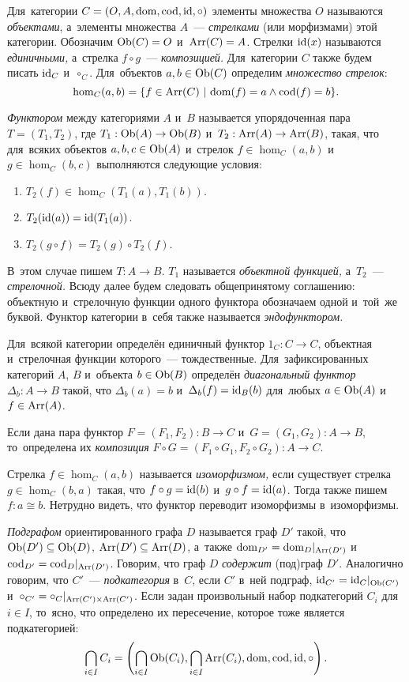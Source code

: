 \documentclass[a4paper,oneside]{article}
\begin{document}
Для~категории $C = (O, A, \mathrm{dom}, \mathrm{cod}, \mathrm{id}, \circ)$ элементы множества $O$ называются \textit{объектами},
а~элементы множества $A$~— \textit{стрелками} (или морфизмами) этой категории. Обозначим $\mathrm{Ob}(C) = O$ и~$\mathrm{Arr}(C) = A$.
Стрелки $\mathrm{id}(x)$ называются \textit{единичными,} а~стрелка $f \circ g$~— \textit{композицией.} Для~категории $C$ также будем писать $\mathrm{id}_C$ и~$\circ_C$.
Для~объектов $a, b \in \mathrm{Ob}(C)$ определим \textit{множество стрелок}:
\[
  \hom_C(a, b) = \{ f \in \mathrm{Arr}(C)\ | \ \mathrm{dom}(f) = a \wedge \mathrm{cod}(f) = b \}.
\]

\textit{Функтором} между категориями $A$ и~$B$ называется упорядоченная пара $T = (T_1, T_2)$,
где $T_1 : \mathrm{Ob}(A) \rightarrow \mathrm{Ob}(B)$ и~$T_2 : \mathrm{Arr}(A) \rightarrow \mathrm{Arr}(B)$,
такая, что для~всяких объектов $a, b, c \in \mathrm{Ob}(A)$ и~стрелок $f \in \hom_C(a, b)$ и~$g \in \hom_C(b, c)$ выполняются
следующие условия:
\begin{enumerate}
  \item $T_2(f) \in \hom_C(T_1(a), T_1(b))$.
  \item $T_2(\mathrm{id}(a)) = \mathrm{id}(T_1(a))$.
  \item $T_2(g \circ f) = T_2(g) \circ T_2(f)$.
\end{enumerate}

В~этом случае пишем $T : A \rightarrow B$. $T_1$ называется \textit{объектной функцией,} а~$T_2$~— \textit{стрелочной.}
Всюду далее будем следовать общепринятому соглашению: объектную и~стрелочную функции одного функтора обозначаем одной и~той~же буквой.
Функтор категории в~себя также называется \textit{эндофунктором.}

Для~всякой категории определён единичный функтор $1_C : C \rightarrow C$, объектная и~стрелочная функции которого~— тождественные.
Для~зафиксированных категорий $A$, $B$ и~объекта $b \in \mathrm{Ob}(B)$ определён \textit{диагональный функтор} $\Delta_b : A \rightarrow B$
такой, что $\Delta_b(a) = b$ и~$\Delta_b(f) = \mathrm{id}_B(b)$ для~любых $a \in \mathrm{Ob}(A)$ и~$f \in \mathrm{Arr}(A)$.

Если дана пара функтор $F = (F_1, F_2) : B \rightarrow C$ и~$G = (G_1, G_2) : A \rightarrow B$,
то~определена их \textit{композиция} $F \circ G = (F_1 \circ G_1, F_2 \circ G_2) : A \rightarrow C$.

Стрелка $f \in \hom_C(a, b)$ называется \textit{изоморфизмом,} если существует стрелка $g \in \hom_C(b, a)$
такая, что $f \circ g = \mathrm{id}(b)$ и~$g \circ f = \mathrm{id}(a)$. Тогда также пишем $f : a \cong b$.
Нетрудно видеть, что функтор переводит изоморфизмы в~изоморфизмы.

\textit{Подграфом} ориентированного графа $D$ называется граф $D'$ такой, что $\mathrm{Ob}(D') \subseteq \mathrm{Ob}(D)$, $\mathrm{Arr}(D') \subseteq \mathrm{Arr}(D)$,
а~также $\mathrm{dom}_{D'} = \mathrm{dom}_{D} |_{\mathrm{Arr}(D')}$ и~$\mathrm{cod}_{D'} = \mathrm{cod}_{D} |_{\mathrm{Arr}(D')}$.
Говорим, что граф $D$ \textit{содержит} (под)граф $D'$.
Аналогично говорим, что $C'$~— \textit{подкатегория} в~$C$, если $C'$ в~ней подграф, $\mathrm{id}_{C'} = \mathrm{id}_{C} |_{\mathrm{Ob}(C')}$
и~$\circ_{C'} = \circ_{C} |_{\mathrm{Arr}(C') \times \mathrm{Arr}(C')}$.
Если задан произвольный набор подкатегорий $C_i$ для~$i \in I$, то~ясно, что определено их пересечение, которое тоже является подкатегорией:
\[
  \bigcap\limits_{i \in I} C_i = \left( \bigcap\limits_{i \in I} \mathrm{Ob}(C_i), \bigcap\limits_{i \in I} \mathrm{Arr}(C_i), \mathrm{dom}, \mathrm{cod}, \mathrm{id}, \circ \right).
\]
\end{document}
